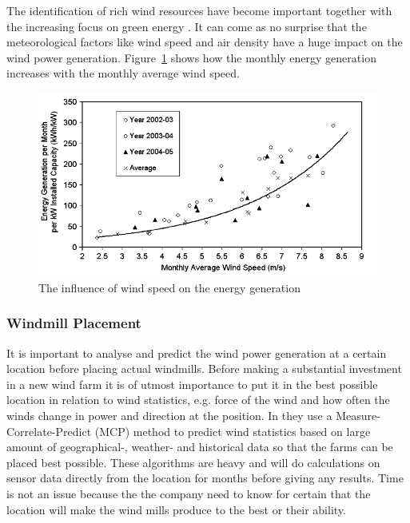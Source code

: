 The identification of rich wind resources have become important together with the increasing focus on green energy \cite{WindPowerGenerationUsingANN}. It can come as no surprise that the meteorological factors like wind speed and air density have a huge impact on the wind power generation. Figure~\ref{fig:energyGeneration} shows how the monthly energy generation increases with the monthly average wind speed. 

\begin{figure}[h!]
\centering
\includegraphics[width=0.8\linewidth,natwidth=898,natheight=587]{billeder/EnergyGenerationVsWindSpeed.png}
\caption{The influence of wind speed on the energy generation \cite{WindPowerGenerationUsingANN}}
\label{fig:energyGeneration}
\end{figure} 

\subsubsection{Windmill Placement}
It is important to analyse and predict the wind power generation at a certain location before placing actual windmills. Before making a substantial investment in a new wind farm it is of utmost importance to put it in the best possible location in relation to wind statistics, e.g. force of the wind and how often the winds change in power and direction at the position. In \cite{4} they use a Measure-Correlate-Predict (MCP) method to predict wind statistics based on large amount of geographical-, weather- and historical data so that the farms can be placed best possible. These algorithms are heavy and will do calculations on sensor data directly from the location for months before giving any results. Time is not an issue because the the company need to know for certain that the location will make the wind mills produce to the best or their ability.

